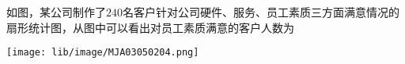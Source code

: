 如图，某公司制作了$240$名客户针对公司硬件、服务、员工素质三方面满意情况的扇形统计图，从图中可以看出对员工素质满意的客户人数为\key{}
\begin{center}
    \texttt{[image: lib/image/MJA03050204.png]}
\end{center}